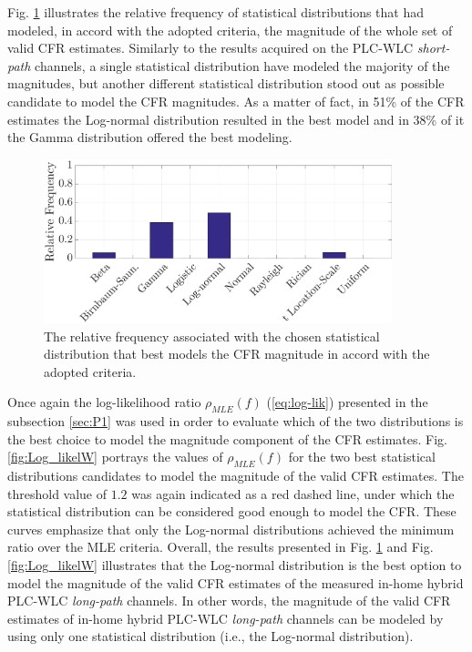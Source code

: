 Fig. \ref{MAG_percentlW} illustrates the relative frequency of statistical distributions that had modeled, in accord with the adopted criteria, the magnitude of the whole set of valid \ac{CFR} estimates. Similarly to the results acquired on the \ac{PLC}-\ac{WLC} \textit{short-path} channels, a single statistical distribution have modeled the majority of the magnitudes, but another different statistical distribution stood out as possible candidate to model the \ac{CFR} magnitudes. As a matter of fact, in 51\% of the \ac{CFR} estimates the Log-normal distribution resulted in the best model and in 38\% of it the Gamma distribution offered the best modeling. 

\begin{figure}[h!]
	\centering
	\includegraphics[width=0.9\textwidth]{images/Mag_percentlW.eps}
	\caption{The relative frequency associated with the chosen statistical distribution that best models the CFR magnitude in accord with the adopted criteria.}
	\label{MAG_percentlW}
\end{figure}

Once again the log-likelihood ratio $\rho_{MLE} (f)$ (\ref{eq:log-lik}) presented in the subsection \ref{sec:P1} was used in order to evaluate which of the two distributions is the best choice to model the magnitude component of the \ac{CFR} estimates. Fig. \ref{fig:Log_likelW} portrays the values of  $\rho_{MLE}(f)$ for the two best statistical distributions candidates to model the magnitude of the valid \ac{CFR} estimates. The threshold value of $1.2$ was again indicated as a red dashed line, under which the statistical distribution can be considered good enough to model the \ac{CFR}. These curves emphasize that only the Log-normal distributions achieved the minimum ratio over the \ac{MLE} criteria. Overall, the results presented in Fig. \ref{MAG_percentlW} and Fig. \ref{fig:Log_likelW} illustrates that the Log-normal distribution is the best option to model the magnitude of the valid \ac{CFR} estimates of the measured in-home hybrid \ac{PLC}-\ac{WLC} \textit{long-path} channels. In other words, the magnitude of the valid \ac{CFR} estimates of in-home hybrid \ac{PLC}-\ac{WLC} \textit{long-path} channels can be modeled by using only one statistical distribution (i.e., the Log-normal distribution).

